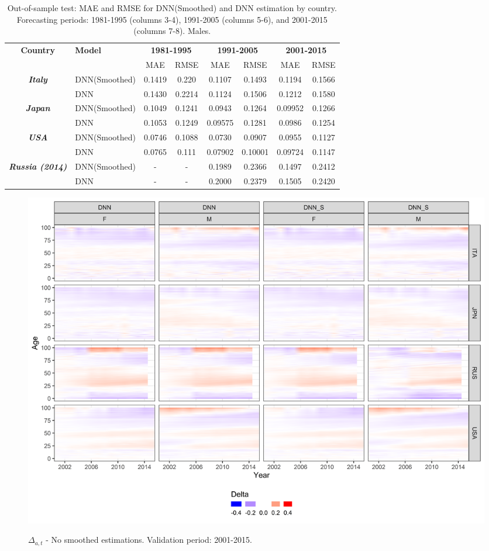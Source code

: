 \documentclass[a4,11pt]{article}
\begin{document}
\begin{table}[H]
		\centering
		\caption{Out-of-sample test: MAE and RMSE for DNN(Smoothed) and DNN estimation by country. Forecasting periods: 1981-1995 (columns 3-4), 1991-2005 (columns 5-6), and 2001-2015 (columns 7-8). Males.}
		\label{tab:2}
			\footnotesize	
		\begin{tabular}{cl|cc|cc|cc}
			\hline 		
\multirow{2}{*}{\textbf{Country}} & \multirow{2}{*}{\textbf{Model}} & \multicolumn{2}{c|}{\textbf{1981-1995}} & \multicolumn{2}{c}{\textbf{1991-2005}} & \multicolumn{2}{c}{\textbf{2001-2015}}\tabularnewline
			\cline{3-8} 
			&  &  MAE & RMSE & MAE & RMSE &  MAE & RMSE\tabularnewline
			\hline 
\multirow{2}{*}{\textbf{\textit{Italy}}} & \multirow{1}{*}{DNN(Smoothed)}  &0.1419& 0.220    &   0.1107&0.1493    &   0.1194&0.1566 \tabularnewline
							 & \multirow{1}{*}{DNN}                   &0.1430& 0.2214  &   0.1124&0.1506    &    0.1212&0.1580 \tabularnewline
                        \hline 
\multirow{2}{*}{\textbf{\textit{Japan}}} & \multirow{1}{*}{DNN(Smoothed)} & 0.1049 &0.1241  &   0.0943&0.1264    &   0.09952& 0.1266 \tabularnewline
			                                    & \multirow{1}{*}{DNN}                 & 0.1053 &0.1249   &  0.09575&0.1281    &  0.0986& 0.1254 \tabularnewline
			\hline
 \multirow{2}{*}{\textbf{\textit{USA}}} &\multirow{1}{*}{DNN(Smoothed)}  &    0.0746 &0.1088 &    0.0730&0.0907      & 0.0955& 0.1127\tabularnewline
							 &\multirow{1}{*}{DNN}                    &    0.0765 & 0.111 &   0.07902&0.10001      & 0.09724&0.1147\tabularnewline
			\hline 
 \multirow{2}{*}{\textbf{\textit{Russia (2014)}}} &\multirow{1}{*}{DNN(Smoothed)}  &-&-&0.1989&0.2366&       0.1497& 0.2412\tabularnewline
									 &\multirow{1}{*}{DNN}                  &-&-& 0.2000 & 0.2379 &   0.1505& 0.2420\tabularnewline
	\hline 

		\end{tabular}
	\end{table}






\begin{figure}[H]
	\centering
	\includegraphics[width=1\linewidth]{no_smooth_1970}\\
	 \caption{$\Delta_{a,t}$ - No smoothed estimations. Validation period: 2001-2015.}
\end{figure}
\end{document}
